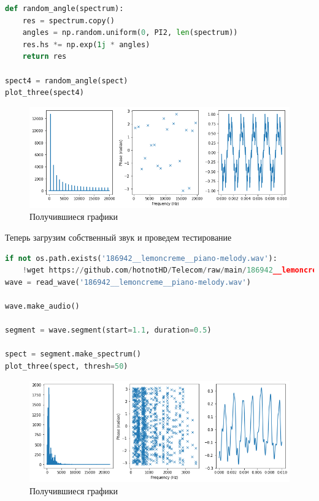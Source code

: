 \begin{lstlisting}[language=Python]
def random_angle(spectrum):
    res = spectrum.copy()
    angles = np.random.uniform(0, PI2, len(spectrum))
    res.hs *= np.exp(1j * angles)
    return res
    
spect4 = random_angle(spect)
plot_three(spect4)
\end{lstlisting}

\begin{figure}[H]
	\begin{center}
		\includegraphics[scale=0.66]{fig/lab06/lab06_14.png}
		\caption{Получившиеся графики}
	\end{center}
\end{figure}

Теперь загрузим собственный звук и проведем тестирование

\begin{lstlisting}[language=Python]
if not os.path.exists('186942__lemoncreme__piano-melody.wav'):
    !wget https://github.com/hotnotHD/Telecom/raw/main/186942__lemoncreme__piano-melody.wav
wave = read_wave('186942__lemoncreme__piano-melody.wav')

wave.make_audio()

segment = wave.segment(start=1.1, duration=0.5)

spect = segment.make_spectrum()
plot_three(spect, thresh=50)
\end{lstlisting}

\begin{figure}[H]
	\begin{center}
		\includegraphics[scale=0.66]{fig/lab06/lab06_15.png}
		\caption{Получившиеся графики}
	\end{center}
\end{figure}

